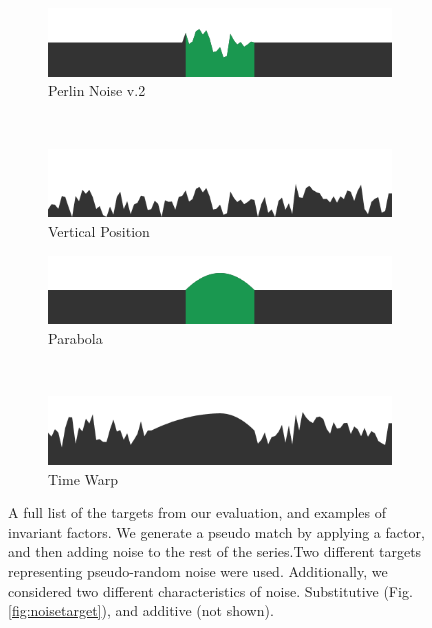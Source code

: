 {\begin{figure}
		\begin{subfigure}[t]{.45\columnwidth}
			\includegraphics[width=\textwidth]{./figures/targets/5}
			\caption{Perlin Noise v.2}
		\end{subfigure}
		~
		\begin{subfigure}[t]{.45\columnwidth}
			\includegraphics[width=\textwidth]{./figures/targets/5_v}
			\caption{Vertical Position}
		\end{subfigure}	
		
		\begin{subfigure}[t]{.45\columnwidth}
			\includegraphics[width=\textwidth]{./figures/targets/6}
			\caption{Parabola}
		\end{subfigure}
		~
		\begin{subfigure}[t]{.45\columnwidth}
			\includegraphics[width=\textwidth]{./figures/targets/6_w}
			\caption{Time Warp}
		\end{subfigure}			
									
		\caption{A full list of the targets from our evaluation, and examples of invariant factors. We generate a pseudo match by applying a factor, and then adding noise to the rest of the series.Two different targets representing pseudo-random noise were used. Additionally, we considered two different characteristics of noise. Substitutive (Fig. \ref{fig:noisetarget}), and additive (not shown).}
		\label{fig:targets}
	\end{figure}
}